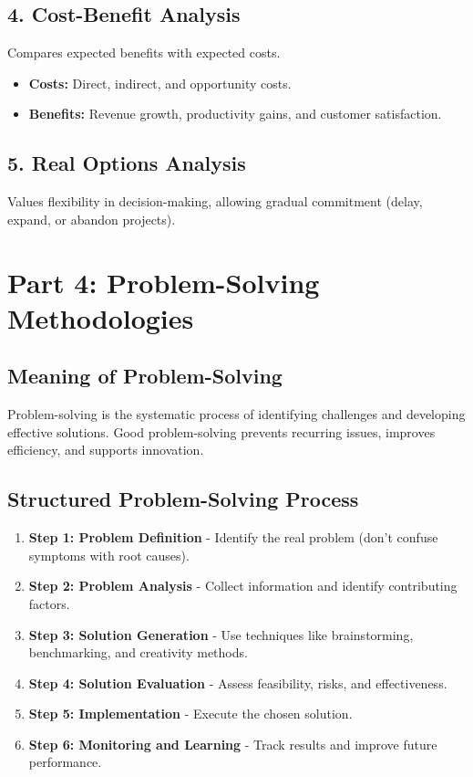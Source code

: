\documentclass[12pt,a4paper]{article}
\begin{document}
\subsection*{4. Cost-Benefit Analysis}
Compares expected benefits with expected costs.
\begin{itemize}
    \item \textbf{Costs:} Direct, indirect, and opportunity costs.
    \item \textbf{Benefits:} Revenue growth, productivity gains, and customer satisfaction.
\end{itemize}

\subsection*{5. Real Options Analysis}
Values flexibility in decision-making, allowing gradual commitment (delay, expand, or abandon projects).

\section*{Part 4: Problem-Solving Methodologies}

\subsection*{Meaning of Problem-Solving}
Problem-solving is the systematic process of identifying challenges and developing effective solutions. Good problem-solving prevents recurring issues, improves efficiency, and supports innovation.

\subsection*{Structured Problem-Solving Process}
\begin{enumerate}
    \item \textbf{Step 1: Problem Definition} - Identify the real problem (don't confuse symptoms with root causes).
    \item \textbf{Step 2: Problem Analysis} - Collect information and identify contributing factors.
    \item \textbf{Step 3: Solution Generation} - Use techniques like brainstorming, benchmarking, and creativity methods.
    \item \textbf{Step 4: Solution Evaluation} - Assess feasibility, risks, and effectiveness.
    \item \textbf{Step 5: Implementation} - Execute the chosen solution.
    \item \textbf{Step 6: Monitoring and Learning} - Track results and improve future performance.
\end{enumerate}
\end{document}
